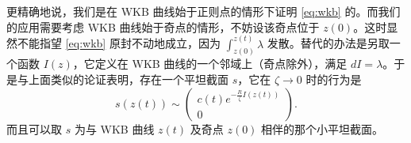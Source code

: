 更精确地说，我们是在 WKB 曲线始于正则点的情形下证明 \eqref{eq:wkb} 的。而我们的应用需要考虑 WKB 曲线始于奇点的情形，不妨设该奇点位于 $z(0)$。这时显然不能指望 \eqref{eq:wkb} 原封不动地成立，因为 $\int_{z(0)}^{z(t)}\lambda$ 发散。替代的办法是另取一个函数 $I(z)$，它定义在 WKB 曲线的一个邻域上（奇点除外），满足 $dI=\lambda$。于是与上面类似的论证表明，存在一个平坦截面 $s$，它在 $\zeta\to0$ 时的行为是
\begin{equation} \label{eq:wkb-sing}
s(z(t)) \sim \begin{pmatrix} c(t) e^{-\frac{R}{\zeta} I(z(t))} \\ 0 \end{pmatrix}.
\end{equation}
而且可以取 $s$ 为与 WKB 曲线 $z(t)$ 及奇点 $z(0)$ 相伴的那个小平坦截面。
